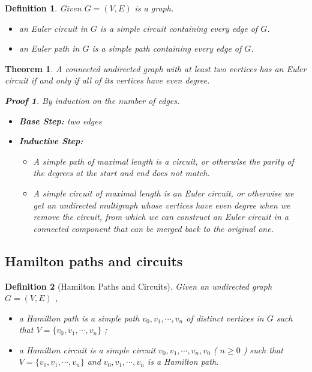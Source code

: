 \documentclass{ctexart}
\newcommand{\。}{．} %
\newenvironment{kuang3}{
    \begin{tcolorbox}[enhanced, breakable, colback=hlan!5!white, boxrule=0pt, frame hidden,
        borderline south={0.5mm}{0.1mm}{hlan}]
    }
    {\end{tcolorbox}}
\newenvironment{lvse}{
    \begin{tcolorbox}[enhanced, breakable, colback=qlv, boxrule=0pt, frame hidden,
        borderline west={0.7mm}{0.1mm}{slv}]
    }
    {\end{tcolorbox}}
\newenvironment{huangse}{
    \begin{tcolorbox}[enhanced, breakable, colback=qhuang, boxrule=0pt, frame hidden,
        borderline west={0.7mm}{0.1mm}{shuang}]
    }
    {\end{tcolorbox}}
\theoremstyle{t} %
\newtheorem{dyhj}{\color{slv} Definition}[subsection] %
\newtheorem{dlhj}{\color{shuang} Theorem}[subsection]
\newtheorem*{zmhj}{\color{slan} Proof}
\newenvironment{dy}{\begin{lvse}\begin{dyhj}}{\end{dyhj}\end{lvse}}
\newenvironment{dl}{\begin{huangse}\begin{dlhj}}{\end{dlhj}\end{huangse}}
\begin{document}
\begin{dy}
    Given $G = (V, E)$ is a graph.
    \begin{itemize}
        \item an Euler circuit in $G$ is a simple circuit containing every edge of $G$.
        \item an Euler path in $G$ is a simple path containing every edge of $G$.
    \end{itemize}
\end{dy}

\begin{dl}
    A connected undirected graph with at least two vertices has an Euler circuit if and only if all of its vertices have even degree.
    \begin{zmhj}
        By induction on the number of edges.
        \begin{itemize}
            \item \textbf{Base Step:} two edges
            \item \textbf{Inductive Step:}
            \begin{itemize}
                \item A simple path of maximal length is a circuit, or otherwise the parity of the degrees at the start and end does not match.
                \item A simple circuit of maximal length is an Euler circuit, or otherwise we get an undirected multigraph whose vertices have even degree when we remove the circuit, from which we can construct an Euler circuit in a connected component that can be merged back to the original one.
            \end{itemize}
        \end{itemize}
    \end{zmhj}
\end{dl}

\begin{kuang3}
    \subsection{Hamilton paths and circuits}
\end{kuang3}

\begin{dy}[Hamilton Paths and Circuits]
    Given an undirected graph  $ G = (V, E) $ ,
    \begin{itemize}
        \item a Hamilton path is a simple path  $ v_0, v_1, \cdots, v_n $  of distinct vertices in  $ G $  such that  $ V = \{v_0, v_1, \cdots, v_n\} $ ;
        \item a Hamilton circuit is a simple circuit  $ v_0, v_1, \cdots, v_n, v_0 $  ( $ n \geq 0 $ ) such that  $ V = \{v_0, v_1, \cdots, v_n\} $  and  $ v_0, v_1, \cdots, v_n $  is a Hamilton path.
    \end{itemize}
\end{dy}
\end{document}
